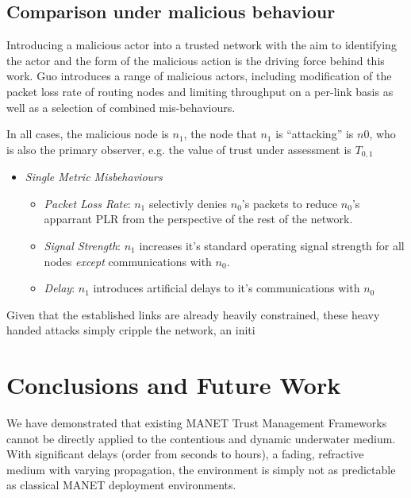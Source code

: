 \documentclass[runningheads,a4paper]{llncs}
\begin{document}
{{\subsection{Comparison under malicious behaviour}

Introducing a malicious actor into a trusted network with the aim to identifying the actor and the form of the malicious action is the driving force behind this work. 
Guo introduces a range of malicious actors, including modification of the packet loss rate of routing nodes and limiting throughput on a per-link basis as well as a selection of combined mis-behaviours. 

In all cases, the malicious node is $n_1$, the node that $n_1$ is ``attacking'' is $n0$, who is also the primary observer, e.g. the value of trust under assessment is $T_{0,1}$
\begin{itemize}
  \item \emph{Single Metric Misbehaviours}
    \begin{itemize}
      \item \emph{Packet Loss Rate}: $n_1$ selectivly denies $n_0$'s packets to reduce $n_0$'s apparrant PLR from the perspective of the rest of the network.
      \item \emph{Signal Strength}: $n_1$ increases it's standard operating signal strength for all nodes \emph{except} communications with $n_0$.
      \item \emph{Delay}: $n_1$ introduces artificial delays to it's communications with $n_0$
    \end{itemize}
\end{itemize}
Given that the established links are already heavily constrained, these heavy handed attacks simply cripple the network, an initi



\section{Conclusions and Future Work}
We have demonstrated that existing MANET Trust Management Frameworks cannot be directly applied to the contentious and dynamic underwater medium.
With significant delays (order from seconds to hours), a fading, refractive medium with varying propagation, the environment is simply not as predictable as classical MANET deployment environments. 

}}
\end{document}
